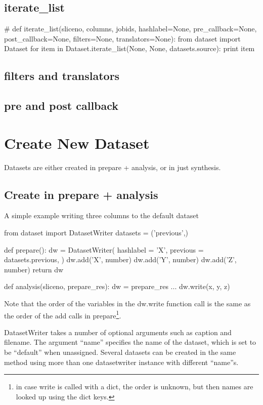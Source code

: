 \subsection{iterate\_list}
\begin{python}
  # def iterate_list(sliceno, columns, jobids, hashlabel=None, pre_callback=None, post_callback=None, filters=None, translators=None):
  from dataset import Dataset
  for item in Dataset.iterate_list(None, None, datasets.source):
    print item
\end{python}

\subsection{filters and translators}

\subsection{pre and post callback}

\section{Create New Dataset}
Datasets are either created in prepare + analysis, or in just
synthesis.

\subsection{Create in prepare + analysis}
A simple example writing three columns to the default dataset

\begin{python}
from dataset import DatasetWriter
datasets = ('previous',)

def prepare():
  dw = DatasetWriter(
    hashlabel = 'X',
    previous = datasets.previous,
  )
  dw.add('X', number)
  dw.add('Y', number)
  dw.add('Z', number)
  return dw

def analysis(sliceno, prepare_res):
  dw = prepare_res
  ...
  dw.write(x, y, z)
\end{python}
Note that the order of the variables in the dw.write function call is
the same as the order of the add calls in prepare\footnote{in case
  write is called with a dict, the order is unknown, but then names
  are looked up using the dict keys.}.

DatasetWriter takes a number of optional arguments such as caption and
filename.  The argument ``name'' specifies the name of the dataset,
which is set to be ``default'' when unassigned.  Several datasets can
be created in the same method using more than one datasetwriter
instance with different ``name''s.

